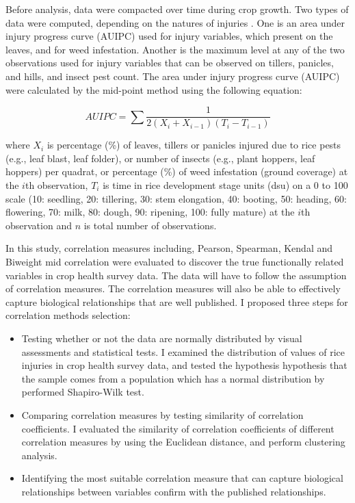 Before analysis, data were compacted over time during crop growth. Two types of data were computed, depending on the natures of injuries \citet{Savary_2009_Survey}. One is an area under injury progress curve (AUIPC) used for injury variables, which present on the leaves, and for weed infestation. Another is the maximum level at any of the two observations used for injury variables that can be observed on tillers, panicles, and hills, and insect pest count. The area under injury progress curve (AUIPC) \citep{Campbell_1990_Introduction} were calculated by the mid-point method using the following equation: 

\begin{equation}
AUIPC = \sum{\frac{1}{2(X_{i} + X_{i-1})(T_{i} - T_{i-1})}}
\end{equation}

where $X_i$ is percentage (\%) of leaves, tillers or panicles injured due to rice pests (e.g., leaf blast, leaf folder), or number of insects (e.g., plant hoppers, leaf hoppers) per quadrat, or percentage (\%) of weed infestation (ground coverage) at the $i$th observation, $T_i$ is time in rice development stage units (dsu) on a 0 to 100 scale (10: seedling, 20: tillering, 30: stem elongation, 40: booting, 50: heading, 60: flowering, 70: milk, 80: dough, 90: ripening, 100: fully mature) at the $i$th observation and $n$ is total number of observations.


In this study, correlation measures including, Pearson, Spearman, Kendal and Biweight mid correlation were evaluated to discover the true functionally related variables in crop health survey data.  The data will have to follow the assumption of correlation measures. The correlation measures will also be able to effectively capture biological relationships that are well published. I proposed three steps for correlation methods selection: 

\begin{itemize}
\item Testing whether or not the data are normally distributed by visual assessments and statistical tests. I examined the distribution of values of rice injuries in crop health survey data, and tested the hypothesis hypothesis that the sample comes from a population which has a normal distribution by performed Shapiro-Wilk test.
\item Comparing correlation measures by testing similarity of correlation coefficients. I evaluated the similarity of correlation coefficients of different correlation measures by using the Euclidean distance, and perform clustering analysis.
\item Identifying the most suitable correlation measure that can capture biological relationships between variables confirm with the published relationships.
\end{itemize}

